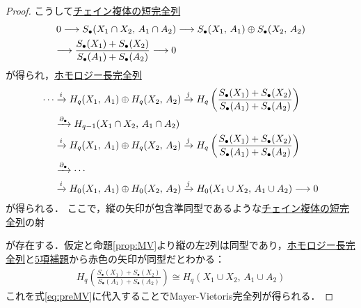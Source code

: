 \documentclass[algtopo_main]{subfiles}
\begin{document}
\begin{proof}
    こうして\hyperref[def:chain-exact]{チェイン複体の短完全列}
    \begin{align}
        0 \longrightarrow S_\bullet (X_1 \cap X_2,\, A_1 \cap A_2) &\longrightarrow S_\bullet(X_1,\, A_1) \oplus S_\bullet (X_2,\, A_2) \\
        \longrightarrow \frac{S_\bullet(X_1) + S_\bullet(X_2)}{S_\bullet(A_1) + S_\bullet(A_2)} \longrightarrow 0
    \end{align}
    が得られ，\hyperref[prop:HES]{ホモロジー長完全列}
    \begin{align}
        \cdots &\xrightarrow{i} H_q(X_1,\, A_1) \oplus H_q(X_2,\, A_2) \xrightarrow{j} H_q \left(  \frac{S_\bullet(X_1) + S_\bullet(X_2)}{S_\bullet(A_1) + S_\bullet(A_2)} \right) \\
        &\xrightarrow{\partial_\bullet} H_{q-1}(X_1 \cap X_2,\, A_1 \cap A_2) \\
        &\xrightarrow{i} H_q(X_1,\, A_1) \oplus H_q(X_2,\, A_2) \xrightarrow{j} H_q \left(  \frac{S_\bullet(X_1) + S_\bullet(X_2)}{S_\bullet(A_1) + S_\bullet(A_2)} \right) \\
        &\xrightarrow{\partial_\bullet} \cdots \\
        &\xrightarrow{i} H_0(X_1,\, A_1) \oplus H_0(X_2,\, A_2) \xrightarrow{j} H_0 (X_1 \cup X_2,\, A_1 \cup A_2) \longrightarrow 0 \label{eq:preMV}
    \end{align}
    が得られる．
    ここで，縦の矢印が包含準同型であるような\hyperref[def:chain-exact]{チェイン複体の短完全列}の射
    \begin{center}
    \end{center}
    が存在する．仮定と命題\ref{prop:MV}より縦の左2列は同型であり，\hyperref[prop:HES]{ホモロジー長完全列}と\hyperref[thm:five-lemma]{5項補題}から赤色の矢印が同型だとわかる：
    \begin{align}
        H_q\left(\frac{S_\bullet(X_1) + S_\bullet(X_2)}{S_\bullet(A_1) + S_\bullet(A_2)}\right) \cong H_q (X_1 \cup X_2,\, A_1 \cup A_2)
    \end{align}
    これを式\eqref{eq:preMV}に代入することでMayer-Vietoris完全列が得られる．
\end{proof}
\end{document}
